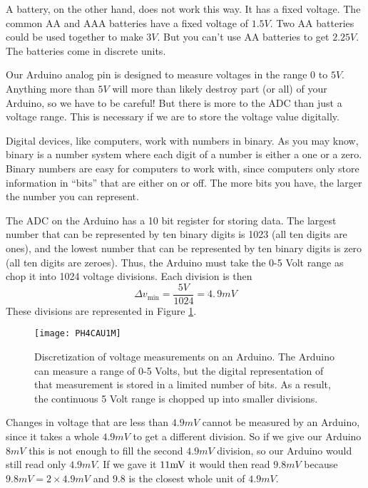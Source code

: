 A battery, on the other hand, does not work this way. 
It has a fixed voltage. The common AA and AAA batteries have a fixed voltage
of $1.5\unit{V}$. Two
AA batteries could be used together to make $3\unit{V}.$ But you can't
use AA batteries to get $2.25\unit{V}.$ The batteries come in discrete
units.

Our Arduino analog pin is designed to measure voltages in the range $0$ to $5%
\unit{V}.$ Anything more than $5\unit{V}$ will more than likely destroy part
(or all) of your Arduino, so we have to be careful! But there
is more to the ADC than just a voltage range. This is necessary if we are to
store the voltage value digitally.

Digital devices, like computers, work with numbers in binary. As you may know,
binary is a number system where each digit of a number is either a one or a 
zero. Binary numbers are easy for computers to work with, since computers
only store information in ``bits'' that are either on or off. The more bits you
have, the larger the number you can represent.

The ADC on the Arduino has a 10 bit register for storing data. The largest
number that can be represented by ten binary digits is 1023 (all
ten digits are ones), and the lowest
number that can be represented by ten binary digits is zero (all ten digits are
zeroes). Thus, the Arduino must take the 0-5 Volt range as chop it into 1024
voltage divisions. Each division is then
\begin{equation*}
\Delta v_{\min }=\frac{5\unit{V}}{1024}=4.\,\allowbreak 9\unit{mV}
\end{equation*}
These divisions are represented in Figure \ref{fig:adc_discretization}.

\begin{figure}[htbp!]
\centering
\texttt{[image: PH4CAU1M]}
\caption[Discretization of voltage measurements on an Arduino]{Discretization
of voltage measurements on an Arduino. The Arduino can measure a range 
of 0-5 Volts, but the digital representation of that measurement is 
stored in a limited number of bits. As a result, the continuous
5 Volt range is chopped up into smaller divisions.}
\label{fig:adc_discretization}
\end{figure} 

Changes in
voltage that are less than $4.9\unit{mV}$ cannot be measured by
an Arduino, since it takes a
whole $4.9\unit{mV}$ to get a different division. So if we give our Arduino $%
8\unit{mV}$ this is not enough to fill the second $4.9\unit{mV}$ division,
so our Arduino would still read only $4.9\unit{mV}.$ If we gave it $11\unit{%
mV}$ it would then read $9.8\unit{mV}$ because $9.8\unit{mV}=2\times 4.9%
\unit{mV}$ and $9.8$ is the closest whole unit of $4.9\unit{mV}.$

